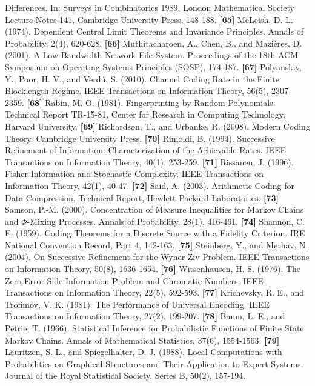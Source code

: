\documentclass[
]{article}
\begin{document}
Differences. In: Surveys in Combinatorics 1989, London Mathematical
Society Lecture Notes 141, Cambridge University Press, 148-188.
\textbf{{[}65{]}} McLeish, D. L. (1974). Dependent Central Limit
Theorems and Invariance Principles. Annals of Probability, 2(4),
620-628.
\textbf{{[}66{]}} Muthitacharoen, A., Chen, B., and Mazi\`eres, D.
(2001). A Low-Bandwidth Network File System. Proceedings of the 18th
ACM Symposium on Operating Systems Principles (SOSP), 174-187.
\textbf{{[}67{]}} Polyanskiy, Y., Poor, H. V., and Verd\'u, S. (2010).
Channel Coding Rate in the Finite Blocklength Regime. IEEE Transactions
on Information Theory, 56(5), 2307-2359.
\textbf{{[}68{]}} Rabin, M. O. (1981). Fingerprinting by Random
Polynomials. Technical Report TR-15-81, Center for Research in Computing
Technology, Harvard University.
\textbf{{[}69{]}} Richardson, T., and Urbanke, R. (2008). Modern Coding
Theory. Cambridge University Press.
\textbf{{[}70{]}} Rimoldi, B. (1994). Successive Refinement of
Information: Characterization of the Achievable Rates. IEEE Transactions
on Information Theory, 40(1), 253-259.
\textbf{{[}71{]}} Rissanen, J. (1996). Fisher Information and
Stochastic Complexity. IEEE Transactions on Information Theory, 42(1),
40-47.
\textbf{{[}72{]}} Said, A. (2003). Arithmetic Coding for Data
Compression. Technical Report, Hewlett-Packard Laboratories.
\textbf{{[}73{]}} Samson, P.-M. (2000). Concentration of Measure
Inequalities for Markov Chains and $\Phi$-Mixing Processes. Annals of
Probability, 28(1), 416-461.
\textbf{{[}74{]}} Shannon, C. E. (1959). Coding Theorems for a Discrete
Source with a Fidelity Criterion. IRE National Convention Record, Part 4,
142-163.
\textbf{{[}75{]}} Steinberg, Y., and Merhav, N. (2004). On Successive
Refinement for the Wyner-Ziv Problem. IEEE Transactions on Information
Theory, 50(8), 1636-1654.
\textbf{{[}76{]}} Witsenhausen, H. S. (1976). The Zero-Error Side
Information Problem and Chromatic Numbers. IEEE Transactions on
Information Theory, 22(5), 592-593.
\textbf{{[}77{]}} Krichevsky, R. E., and Trofimov, V. K. (1981). The
Performance of Universal Encoding. IEEE Transactions on Information
Theory, 27(2), 199-207.
\textbf{{[}78{]}} Baum, L. E., and Petrie, T. (1966). Statistical
Inference for Probabilistic Functions of Finite State Markov Chains.
Annals of Mathematical Statistics, 37(6), 1554-1563.
\textbf{{[}79{]}} Lauritzen, S. L., and Spiegelhalter, D. J. (1988).
Local Computations with Probabilities on Graphical Structures and
Their Application to Expert Systems. Journal of the Royal Statistical
Society, Series B, 50(2), 157-194.
\end{document}
